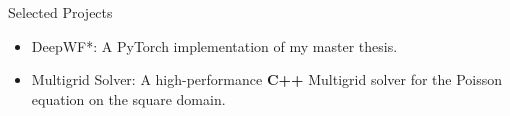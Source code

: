 \begin{cvsection}{Selected Projects}
\begin{cvsubsection}{}{}{}
        \begin{itemize}
            \item DeepWF*: A PyTorch implementation of my master thesis.
            \item Multigrid Solver: A high-performance \textbf{C++} Multigrid solver for the Poisson equation on the square domain.
        \end{itemize}
    \end{cvsubsection}
\end{cvsection}
